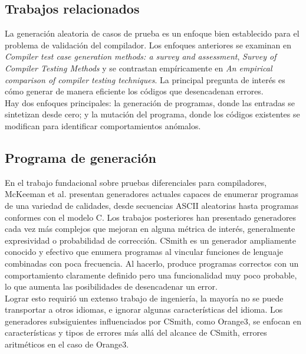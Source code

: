 \subsection{Trabajos relacionados}
La generación aleatoria de casos de prueba es un enfoque bien establecido para el problema de validación del compilador. Los enfoques anteriores se examinan en \textit{Compiler test case generation methods: a survey and assessment}\cite{Boujarwah1997CompilerTC}, \textit{Survey of Compiler Testing Methods}\cite{Kossatchev2005CompilerTM} y se contrastan empíricamente en \textit{An empirical comparison of compiler testing techniques}\cite{ComparisonCompilerTechniques}. La principal pregunta de interés es cómo generar de manera eficiente los códigos que desencadenan errores.\\

Hay dos enfoques principales: la generación de programas, donde las entradas se sintetizan desde cero; y la mutación del programa, donde los códigos existentes se modifican para identificar comportamientos anómalos.

\subsection{Programa de generación}
En el trabajo fundacional sobre pruebas diferenciales para compiladores, McKeeman et al. presentan generadores actuales capaces de enumerar programas de una variedad de calidades, desde secuencias ASCII aleatorias hasta programas conformes con el modelo C\cite{McKeeman98differentialtesting}. Los trabajos posteriores han presentado generadores cada vez más complejos que mejoran en alguna métrica de interés, generalmente expresividad o probabilidad de corrección. CSmith\cite{Yang:2011:FUB:1993316.1993532} es un generador ampliamente conocido y efectivo que enumera programas al vincular funciones de lenguaje combinadas con poca frecuencia. Al hacerlo, produce programas correctos con un comportamiento claramente definido pero una funcionalidad muy poco probable, lo que aumenta las posibilidades de desencadenar un error.\\

Lograr esto requirió un extenso trabajo de ingeniería, la mayoría no se puede transportar a otros idiomas, e ignorar algunas características del idioma. Los generadores subsiguientes influenciados por CSmith, como Orange3\cite{Nagai:Hashimoto:Ishiura}, se enfocan en características y tipos de errores más allá del alcance de CSmith, errores aritméticos en el caso de Orange3.\\

